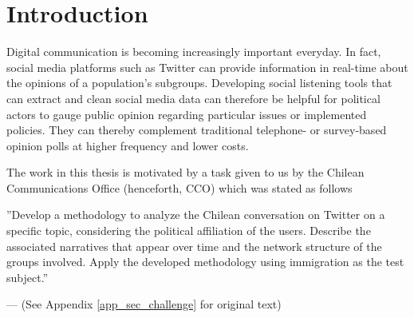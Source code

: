 \clearpage 
{} %

\section{Introduction}

    Digital communication is becoming increasingly important everyday. In fact, social media platforms such as Twitter can provide information in real-time about the opinions of a population's subgroups. Developing social listening tools that can extract and clean social media data can therefore be helpful for political actors to gauge public opinion regarding particular issues or implemented policies. They can thereby complement traditional telephone- or survey-based opinion polls at higher frequency and lower costs.
    
    The work in this thesis is motivated by a task given to us by the Chilean Communications Office (henceforth, CCO) which was stated as follows
    
    \epigraph{''Develop a methodology to analyze the Chilean conversation on Twitter on a specific topic, considering the political affiliation of the users. Describe the associated narratives that appear over time and the network structure of the groups involved. Apply the developed methodology using immigration as the test subject.''}{--- (See Appendix \ref{app_sec_challenge} for original text)}
    
    
